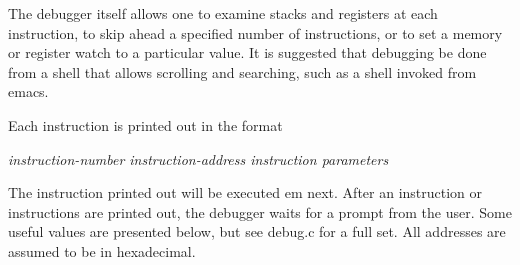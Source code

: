 \documentclass[11pt]{article}
\begin{document}
The debugger itself allows one to examine stacks and registers at each
instruction, to skip ahead a specified number of instructions, or to
set a memory or register watch to a particular value.  It is suggested
that debugging be done from a shell that allows scrolling and
searching, such as a shell invoked from emacs.

Each instruction is printed out in the format
\begin{center}
{\em instruction-number instruction-address  instruction  parameters}
\end{center}
The instruction printed out will be executed {em next}.  After an
instruction or instructions are printed out, the debugger waits for a
prompt from the user.  Some useful values are presented below, but see
debug.c for a full set.  All addresses are assumed to be in
hexadecimal.
\end{document}
